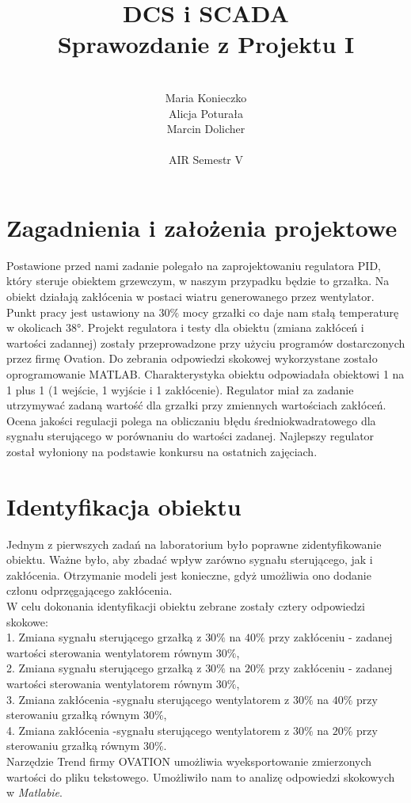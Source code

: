 \documentclass[12pt, a4paper]{article}
\author{
	\\ Maria Konieczko
	\\ Alicja Poturała
	\\ Marcin Dolicher
	\\
	\\ AIR Semestr V
}
\title{	
    DCS i SCADA \\
	Sprawozdanie z Projektu I		
}
\date{}
\begin{document}
\maketitle
\newpage
\tableofcontents

\newpage
\section{Zagadnienia i założenia projektowe}
Postawione przed nami zadanie polegało na zaprojektowaniu regulatora PID, który steruje obiektem grzewczym, w naszym przypadku będzie to grzałka. Na obiekt działają zakłócenia w postaci wiatru generowanego przez wentylator. Punkt pracy jest ustawiony na $30 \%$ mocy grzałki co daje nam stałą temperaturę w okolicach \ang{38}. Projekt regulatora i testy dla obiektu (zmiana zakłóceń i wartości zadannej) zostały przeprowadzone przy użyciu programów dostarczonych przez firmę Ovation. Do zebrania odpowiedzi skokowej wykorzystane zostało oprogramowanie MATLAB. Charakterystyka obiektu odpowiadała obiektowi 1 na 1 plus 1 (1 wejście, 1 wyjście i 1 zakłócenie). Regulator miał za zadanie utrzymywać zadaną wartość dla grzałki przy zmiennych wartościach zakłóceń. Ocena jakości regulacji polega na obliczaniu błędu średniokwadratowego dla sygnału sterującego w porównaniu do wartości zadanej. Najlepszy regulator został wyłoniony na podstawie konkursu na ostatnich zajęciach. 
\section{Identyfikacja obiektu}
Jednym z pierwszych zadań na laboratorium było poprawne zidentyfikowanie obiektu. Ważne było, aby zbadać wpływ zarówno sygnału sterującego, jak i zakłócenia. Otrzymanie modeli jest konieczne, gdyż umożliwia ono dodanie członu odprzęgającego zakłócenia.\\
W celu dokonania identyfikacji obiektu zebrane zostały cztery odpowiedzi skokowe:\\
1. Zmiana sygnału sterującego grzałką z $30\%$ na $40\%$ przy zakłóceniu - zadanej wartości sterowania wentylatorem równym $30\%$,\\
2. Zmiana sygnału sterującego grzałką z $30\%$ na $20\%$ przy zakłóceniu - zadanej wartości sterowania wentylatorem równym $30\%$,\\
3. Zmiana zakłócenia -sygnału sterującego wentylatorem z $30\%$ na $40\%$ przy sterowaniu grzałką równym $30\%$,\\
4. Zmiana zakłócenia -sygnału sterującego wentylatorem z $30\%$ na $20\%$ przy sterowaniu grzałką równym $30\%$.\\
Narzędzie Trend firmy OVATION umożliwia wyeksportowanie zmierzonych wartości do pliku tekstowego. Umożliwiło nam to analizę odpowiedzi skokowych w \textit{Matlabie}.  
\end{document}
